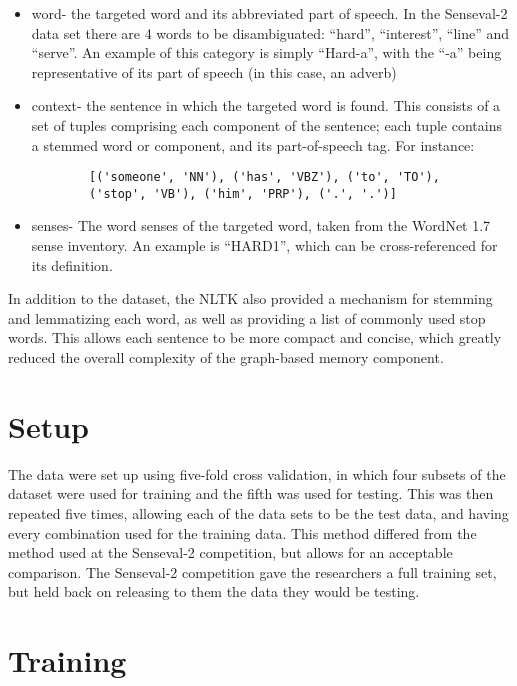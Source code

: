 \begin{itemize}     
	\item word- the targeted word and its abbreviated part of speech. In the 
	Senseval-2 data set there are 4 words to be disambiguated: ``hard'', 
	``interest'', ``line'' and ``serve''. An example of this category is simply
	``Hard-a'', with the ``-a'' being representative of its part of speech (in 
	this case, an adverb)
	\item context- the sentence in which the targeted word is found. This consists of 
	a set of tuples comprising each component of the sentence; each tuple 
	contains a stemmed word or component, and its part-of-speech tag. For 
	instance: 
	\begin{verbatim}
		[('someone', 'NN'), ('has', 'VBZ'), ('to', 'TO'), 
		('stop', 'VB'), ('him', 'PRP'), ('.', '.')] 
	\end{verbatim}

	\item senses- The word senses of the targeted word, taken from the WordNet 
	1.7 sense inventory. An example is ``HARD1'', which can be cross-referenced 
	for its definition. 
\end{itemize}

In addition to the dataset, the NLTK also provided a mechanism for stemming and
lemmatizing each word, as well as providing a list of commonly used stop words.
This allows each sentence to be more compact and concise, which greatly reduced
the overall complexity of the graph-based memory component.

\section{Setup}

The data were set up using five-fold cross validation, in which four subsets of
the dataset were used for training and the fifth was used for testing. This
was then repeated five times, allowing each of the data sets to be the test
data, and having every combination used for the training data.  This method
differed from the method used at the Senseval-2 competition, but allows for an
acceptable comparison.  The Senseval-2 competition gave the researchers a full
training set, but held back on releasing to them the data they would be testing.

\section{Training}

